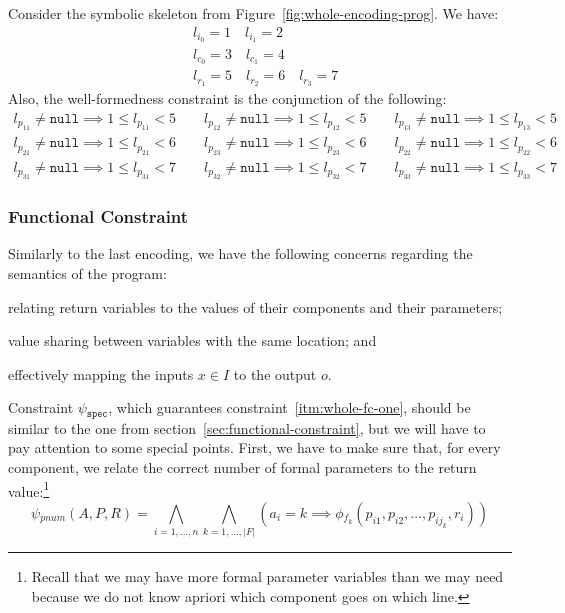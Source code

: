 \begin{example}
  Consider the symbolic skeleton from Figure~\ref{fig:whole-encoding-prog}.
  We have:
  \begin{align*}
    &l_{i_0} = 1 \quad l_{i_1} = 2 \\
    &l_{c_0} = 3 \quad l_{c_1} = 4 \\
    &l_{r_1} = 5 \quad l_{r_2} = 6 \quad l_{r_3} = 7
  \end{align*}
  Also, the well-formedness constraint is the conjunction of the following:
  \begin{align*}
           l_{p_{11}} \neq \mathtt{null} \implies 1 \leq l_{p_{11}} < 5
    \qquad l_{p_{12}} \neq \mathtt{null} \implies 1 \leq l_{p_{12}} < 5
    \qquad l_{p_{13}} \neq \mathtt{null} \implies 1 \leq l_{p_{13}} < 5 \\
           l_{p_{21}} \neq \mathtt{null} \implies 1 \leq l_{p_{21}} < 6
    \qquad l_{p_{23}} \neq \mathtt{null} \implies 1 \leq l_{p_{23}} < 6
    \qquad l_{p_{22}} \neq \mathtt{null} \implies 1 \leq l_{p_{22}} < 6 \\
           l_{p_{31}} \neq \mathtt{null} \implies 1 \leq l_{p_{31}} < 7
    \qquad l_{p_{32}} \neq \mathtt{null} \implies 1 \leq l_{p_{32}} < 7
    \qquad l_{p_{33}} \neq \mathtt{null} \implies 1 \leq l_{p_{33}} < 7
  \end{align*}
\end{example}
%
\subsubsection{Functional Constraint}

Similarly to the last encoding, we have the following concerns regarding the
semantics of the program:
\begin{enumerate*}[(1)]
\item \label{itm:whole-fc-one} relating return variables to the values of their
components and their parameters;
\item \label{itm:whole-fc-two} value sharing between variables with the same
location; and
\item \label{itm:whole-fc-three} effectively mapping the inputs $x \in I$ to the
output $o$.
\end{enumerate*}

Constraint $\psi{}_{\mathtt{spec}}$, which guarantees
constraint~\ref{itm:whole-fc-one}, should be similar to the one from
section~\ref{sec:functional-constraint}, but we will have to pay attention to
some special points.
First, we have to make sure that, for every component, we relate the correct
number of formal parameters to the return value:\footnote{Recall that we may
have more formal parameter variables than we may need because we do not know
apriori which component goes on which line.}
%
\[
  \psi{}_{pnum}(A, P, R) =
  \bigwedge_{i=1,\ldots,n}\bigwedge_{k=1,\ldots,|F|}
  (a_i = k \implies \phi{}_{f_{k}}(p_{i1}, p_{i2}, \ldots, p_{ij_k}, r_i))
\]

